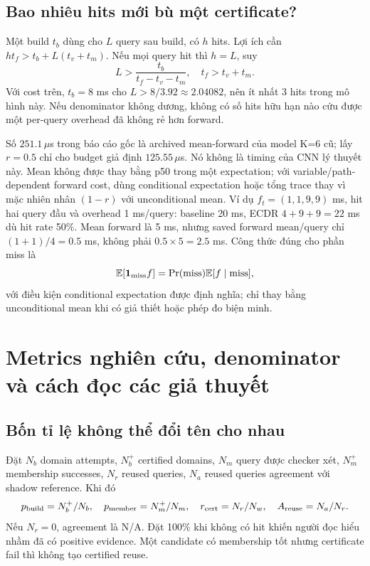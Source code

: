 \documentclass[11pt,a4paper]{article}
\newcommand{\ind}{\mathbf1}
\newcommand{\E}{\mathbb E}
\theoremstyle{definition}
\begin{document}
\subsection{Bao nhiêu hits mới bù một certificate?}
Một build $t_b$ dùng cho $L$ query sau build, có $h$ hits. Lợi ích cần
$ht_f>t_b+L(t_v+t_m)$. Nếu mọi query hit thì $h=L$, suy
\begin{equation}
L>\frac{t_b}{t_f-t_v-t_m},\quad t_f>t_v+t_m.
\end{equation}
Với cost trên, $t_b=8$ ms cho $L>8/3.92\approx2.04082$, nên ít nhất
3 hits trong mô hình này. Nếu denominator không dương, không có số hits
hữu hạn nào cứu được một per-query overhead đã không rẻ hơn forward.

Số $251.1\,\mu$s trong báo cáo gốc là archived mean-forward của model K=6
cũ; lấy $r=0.5$ chỉ cho budget giả định $125.55\,\mu$s. Nó không là timing
của CNN lý thuyết này. Mean không được thay bằng p50 trong một expectation;
với variable/path-dependent forward cost, dùng conditional expectation hoặc
tổng trace thay vì mặc nhiên nhân $(1-r)$ với unconditional mean.
Ví dụ $f_t=(1,1,9,9)$ ms, hit hai query đầu và overhead 1 ms/query:
baseline 20 ms, ECDR $4+9+9=22$ ms dù hit rate 50\%. Mean forward là
5 ms, nhưng saved forward mean/query chỉ $(1+1)/4=0.5$ ms, không phải
$0.5\times5=2.5$ ms. Công thức đúng cho phần miss là
\begin{equation}
\E[\ind_{\rm miss}f]=\Pr(\mathrm{miss})\E[f\mid\mathrm{miss}],
\end{equation}
với điều kiện conditional expectation được định nghĩa; chỉ thay bằng
unconditional mean khi có giả thiết hoặc phép đo biện minh.

\section{Metrics nghiên cứu, denominator và cách đọc các giả thuyết}
\subsection{Bốn tỉ lệ không thể đổi tên cho nhau}
Đặt $N_b$ domain attempts, $N_b^+$ certified domains, $N_m$ query được
checker xét, $N_m^+$ membership successes, $N_r$ reused queries, $N_a$
reused queries agreement với shadow reference. Khi đó
\begin{equation}
p_{\rm build}=N_b^+/N_b,\quad
p_{\rm member}=N_m^+/N_m,\quad
r_{\rm cert}=N_r/N_w,\quad A_{\rm reuse}=N_a/N_r.
\end{equation}
Nếu $N_r=0$, agreement là N/A. Đặt 100\% khi không có hit khiến người đọc
hiểu nhầm đã có positive evidence. Một candidate có membership tốt nhưng
certificate fail thì không tạo certified reuse.
\end{document}
